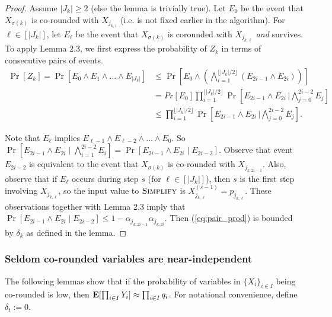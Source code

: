 \begin{proof}
Assume $|J_k|\ge2$ (else the lemma is trivially true).
Let $E_{0}$ be the event that $X_{\sigma(k)}$ is co-rounded with $X_{j_{k,1}}$ (i.e. is not fixed earlier in the algorithm).
For $\ell\in[|J_k|]$, let $E_\ell$ be the event that $X_{\sigma(k)}$ is corounded with $X_{j_{k,\ell}}$ \emph{and} survives. To apply Lemma 2.3, we first express the probability of $Z_k$ in terms of consecutive pairs of events.
\begin{align}
\Pr[Z_k]=\Pr[E_0\land E_1\land\ldots\land E_{|J_k|}]
&\le \Pr\left[E_0\land \left(\bigwedge_{i=1}^{\lfloor |J_k|/2\rfloor}(E_{2i-1}\land E_{2i})\right)\right] 
\nonumber\\&= Pr[E_0]\prod_{i=1}^{\lfloor |J_k|/2\rfloor}\Pr\left[ E_{2i-1}\land E_{2i}\,\Big\vert \bigwedge_{j=0}^{2i-2} E_j\right]
\nonumber\\&\le \prod_{i=1}^{\lfloor |J_k|/2\rfloor}\Pr\left[ E_{2i-1}\land E_{2i}\,\Big\vert \bigwedge_{j=0}^{2i-2} E_j\right].
\label{eq:pair_prod}
\end{align}


Note that $E_{\ell}$ implies $E_{\ell-1}\land E_{\ell-2}\land\ldots\land E_0$. So $\Pr\left[E_{2i-1}\land E_{2i}\mid \bigwedge_{i=1}^{2i-2} E_i\right]=\Pr\left[E_{2i-1}\land E_{2i}\mid E_{2i-2}\right]$.
Observe that event $E_{2i-2}$ is equivalent to the event that $X_{\sigma(k)}$ is co-rounded with $X_{j_{k,2i-1}}$. Also, observe that if $E_\ell$ occurs during step $s$ (for $\ell\in[|J_k|]$), then $s$ is the first step involving $X_{j_{k,\ell}}$, so the input value to $\textsc{Simplify}$ is $X_{j_{k,\ell}}^{(s-1)}=p_{j_{k,\ell}}$. These observations together with Lemma 2.3 imply that $\Pr\left[E_{2i-1}\land E_{2i}\mid E_{2i-2}\right]\le 1-\alpha_{j_{k,2i-1}}\alpha_{j_{k,2i}}$. Then (\ref{eq:pair_prod}) is bounded by $\delta_k$ as defined in the lemma.
\end{proof}

\subsubsection{Seldom co-rounded variables are near-independent}

The following lemmas show that if the probability of variables in $\{X_i\}_{i\in I}$ being co-rounded is low, then $\text{\bf E}[\prod_{i\in I} Y_i]\approx \prod_{i\in I} q_i$. For notational convenience, define $\delta_t:=0$.


